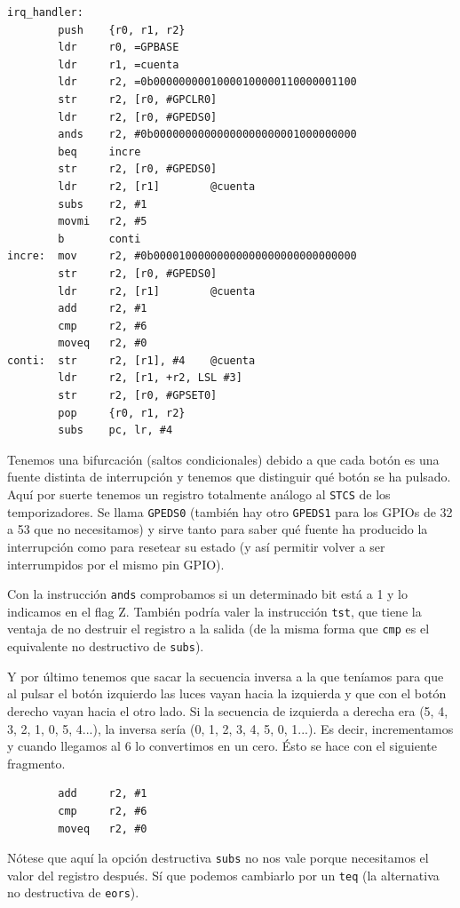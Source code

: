 \begin{lstlisting}
irq_handler:
        push    {r0, r1, r2}
        ldr     r0, =GPBASE
        ldr     r1, =cuenta
        ldr     r2, =0b00000000010000100000110000001100
        str     r2, [r0, #GPCLR0]
        ldr     r2, [r0, #GPEDS0]
        ands    r2, #0b00000000000000000000001000000000
        beq     incre
        str     r2, [r0, #GPEDS0]
        ldr     r2, [r1]        @cuenta
        subs    r2, #1
        movmi   r2, #5
        b       conti
incre:  mov     r2, #0b00001000000000000000000000000000
        str     r2, [r0, #GPEDS0]
        ldr     r2, [r1]        @cuenta
        add     r2, #1
        cmp     r2, #6
        moveq   r2, #0
conti:  str     r2, [r1], #4    @cuenta
        ldr     r2, [r1, +r2, LSL #3]
        str     r2, [r0, #GPSET0]
        pop     {r0, r1, r2}
        subs    pc, lr, #4
\end{lstlisting}

Tenemos una bifurcación (saltos condicionales) debido a que cada botón es una fuente distinta
de interrupción y tenemos que distinguir qué botón se ha pulsado. Aquí por suerte tenemos
un registro totalmente análogo al {\tt STCS} de los temporizadores. Se llama {\tt GPEDS0}
(también hay otro {\tt GPEDS1} para los GPIOs de 32 a 53 que no necesitamos) y sirve tanto
para saber qué fuente ha producido la interrupción como para resetear su estado (y así permitir
volver a ser interrumpidos por el mismo pin GPIO).

Con la instrucción {\tt ands} comprobamos si un determinado bit está a 1 y lo indicamos en el
flag Z. También podría valer la instrucción {\tt tst}, que tiene la ventaja de no destruir
el registro a la salida (de la misma forma que {\tt cmp} es el equivalente no destructivo de
{\tt subs}).

Y por último tenemos que sacar la secuencia inversa a la que teníamos para que al pulsar el
botón izquierdo las luces vayan hacia la izquierda y que con el botón derecho vayan hacia
el otro lado. Si la secuencia de izquierda a derecha era  (5, 4, 3, 2, 1, 0, 5, 4...), la
inversa sería (0, 1, 2, 3, 4, 5, 0, 1...). Es decir, incrementamos y cuando llegamos al 6
lo convertimos en un cero. Ésto se hace con el siguiente fragmento.

\begin{lstlisting}
        add     r2, #1
        cmp     r2, #6
        moveq   r2, #0
\end{lstlisting}

Nótese que aquí la opción destructiva {\tt subs} no nos vale porque necesitamos el valor del
registro después. Sí que podemos cambiarlo por un {\tt teq} (la alternativa no destructiva
de {\tt eors}).

